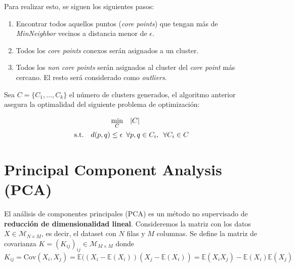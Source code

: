 Para realizar esto, se siguen los siguientes pasos: 

\begin{enumerate}
    \item Encontrar todos aquellos puntos (\textit{core points}) que tengan más de \textit{MinNeighbor} vecinos a distancia menor de $\epsilon$. 
    \item Todos los \textit{core points} conexos serán asignados a un cluster. 
    \item Todos los \textit{non core points} serán asignados al cluster del \textit{core point} más cercano. El resto será considerado como \textit{outliers}. 
\end{enumerate}

Sea $C = \{ C_1 , \dots , C_{k} \}$ el número de clusters generados, el algoritmo anterior asegura la optimalidad del siguiente problema de optimización: 

\begin{equation*}
\begin{aligned}
\min_{C} \quad &|C| \\
\textrm{s.t.} \quad d(p,q) \leq \epsilon \hspace{0.5em} \forall &p,q \in C_i, \hspace{0.5em} \forall C_i \in C
\end{aligned}
\end{equation*}

\section{Principal Component Analysis (PCA)}

El análisis de componentes principales (PCA) es un método no supervisado de \textbf{reducción de dimensionalidad lineal}. Consideremos la matriz con los datos $X \in \mathcal{M}_{N \times M}$, es decir, el dataset con $N$ filas y $M$ columnas. Se define la matriz de covarianza $K = (K_{ij})_{ij} \in \mathcal{M}_{M \times M}$ donde  
$$K_{ij} = \text{Cov}(X_i, X_j) = \mathbb{E}((X_i - \mathbb{E}(X_i))(X_j - \mathbb{E}(X_i)) = \mathbb{E}(X_iX_j) - \mathbb{E}(X_i)\mathbb{E}(X_j)$$

